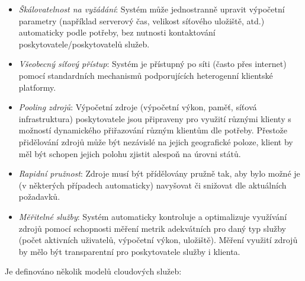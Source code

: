 \begin{itemize} %
  \item{\textit{Škálovatelnost na vyžádání}}: Systém může jednostranně upravit výpočetní parametry (například serverový čas, velikost síťového uložiště, atd.) automaticky podle potřeby, bez nutnosti kontaktování poskytovatele/poskytovatelů služeb.
  \item{\textit{Všeobecný síťový přístup}}: Systém je přístupný po síti (často přes internet) pomocí standardních mechanismů podporujících heterogenní klientské platformy.
  \item{\textit{Pooling zdrojů}}: Výpočetní zdroje (výpočetní výkon, paměť, síťová infrastruktura) poskytovatele jsou připraveny pro využití různými klienty s možností dynamického přiřazování různým klientům dle potřeby. Přestože přidělování zdrojů může být nezávislé na jejich geografické poloze, klient by měl být schopen jejich polohu zjistit alespoň na úrovni států.
  \item{\textit{Rapidní pružnost}}: Zdroje musí být přídělovány pružně tak, aby bylo možné je (v některých případech automaticky) navyšovat či snižovat dle aktuálních požadavků.
  \item{\textit{Měřitelné služby}}: Systém automaticky kontroluje a optimalizuje využívání zdrojů pomocí schopnosti měření metrik adekvátních pro daný typ služby (počet aktivních uživatelů, výpočetní výkon, uložiště). Měření využití zdrojů by mělo být transparentní pro poskytovatele služby i klienta.
\end{itemize}

Je definováno několik modelů cloudových služeb:


